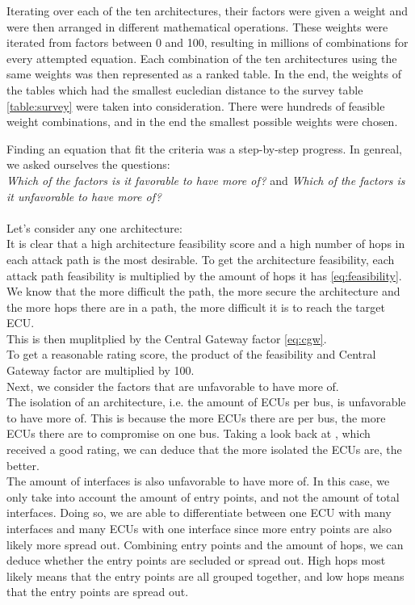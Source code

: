 \hfill  \break

Iterating over each of the ten architectures, their factors were given a weight and were then arranged in different mathematical operations.
These weights were iterated from factors between 0 and 100, resulting in millions of combinations for every attempted equation.
Each combination of the ten architectures using the same weights was then represented as a ranked table. 
In the end, the weights of the tables which had the smallest eucledian distance to the survey table \ref{table:survey} were taken into consideration.
There were hundreds of feasible weight combinations, and in the end the smallest possible weights were chosen.

Finding an equation that fit the criteria was a step-by-step progress.
In genreal, we asked ourselves the questions:\\
\textit{Which of the factors is it favorable to have more of?} and \textit{Which of the factors is it unfavorable to have more of?}\\\\

Let's consider any one architecture:\\
It is clear that a high architecture feasibility score and a high number of hops in each attack path is the most desirable.
To get the architecture feasibility, each attack path feasibility is multiplied by the amount of hops it has \ref{eq:feasibility}.
We know that the more difficult the path, the more secure the architecture and the more hops there are in a path, the more difficult it is to reach the target ECU.\\
This is then muplitplied by the Central Gateway factor \ref{eq:cgw}.\\
To get a reasonable rating score, the product of the feasibility and Central Gateway factor are multiplied by 100.\\

Next, we consider the factors that are unfavorable to have more of.\\
The isolation of an architecture, i.e. the amount of ECUs per bus, is unfavorable to have more of.
This is because the more ECUs there are per bus, the more ECUs there are to compromise on one bus.
Taking a look back at , which received a good rating, we can deduce that the more isolated the ECUs are, the better.\\
The amount of interfaces is also unfavorable to have more of.
In this case, we only take into account the amount of entry points, and not the amount of total interfaces.
Doing so, we are able to differentiate between one ECU with many interfaces and many ECUs with one interface since more entry points are also likely more spread out.
Combining entry points and the amount of hops, we can deduce whether the entry points are secluded or spread out.
High hops most likely means that the entry points are all grouped together, and low hops means that the entry points are spread out.\\

